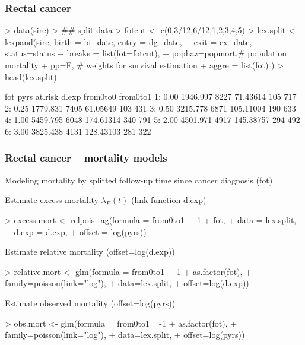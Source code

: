 \documentclass[handout,12pt,dvipsnames,t]{beamer}
\begin{document}
\begin{frame}[fragile]
   \frametitle{Rectal cancer}

{\footnotesize
\begin{Schunk}
\begin{Sinput}
> data(sire)
>  ## split data
>  fotcut <- c(0,3/12,6/12,1,2,3,4,5)
>  lex.split <- lexpand(sire, birth = bi_date, entry = dg_date,
+                       exit = ex_date, 
+                       status=status %
+                       breaks = list(fot=fotcut), 
+                       pophaz=popmort,# population mortality
+                       pp=F, # weights for survival estimation
+                       aggre = list(fot) )
> head(lex.split)
\end{Sinput}
\begin{Soutput}
    fot     pyrs at.risk     d.exp from0to0 from0to1
1: 0.00 1946.997    8227  71.43614      105      717
2: 0.25 1779.831    7405  61.05649      103      431
3: 0.50 3215.778    6871 105.11004      190      633
4: 1.00 5459.795    6048 174.61314      340      791
5: 2.00 4501.971    4917 145.38757      294      492
6: 3.00 3825.438    4131 128.43103      281      322
\end{Soutput}
\end{Schunk}
}

\end{frame}


\begin{frame}[fragile]
   \frametitle{Rectal cancer -- mortality models}

Modeling mortality by splitted follow-up time since cancer diagnosis (fot)

Estimate excess mortality $\lambda_E(t)$ (link function d.exp)

{\scriptsize
\begin{Schunk}
\begin{Sinput}
> excess.mort <- relpois_ag(formula = from0to1 ~ -1 + fot,  
+ data = lex.split, 
+ d.exp = d.exp, 
+ offset = log(pyrs))
\end{Sinput}
\end{Schunk}
}

Estimate relative mortality (offset=log(d.exp))
{\scriptsize
\begin{Schunk}
\begin{Sinput}
> relative.mort <- glm(formula = from0to1 ~ -1 + as.factor(fot),
+ family=poisson(link="log"),
+ data=lex.split,
+ offset=log(d.exp))
\end{Sinput}
\end{Schunk}
}
Estimate observed mortality (offset=log(pyrs))
{\scriptsize
\begin{Schunk}
\begin{Sinput}
> obs.mort <- glm(formula = from0to1 ~ -1 + as.factor(fot),
+ family=poisson(link="log"),
+ data=lex.split,
+ offset=log(pyrs))
\end{Sinput}
\end{Schunk}
}


\end{frame}
\end{document}
